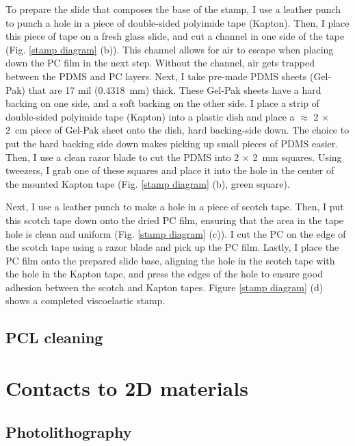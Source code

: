 \documentclass[double,12pt,1in]{beavtex}
\begin{document}
To prepare the slide that composes the base of the stamp, I use a leather punch to punch a hole in a piece of double-sided polyimide tape (Kapton). Then, I place this piece of tape on a fresh glass slide, and cut a channel in one side of the tape (Fig. \ref{stamp diagram} (b)). This channel allows for air to escape when placing down the PC film in the next step. Without the channel, air gets trapped between the PDMS and PC layers. Next, I take pre-made PDMS sheets (Gel-Pak) that are 17 mil (\SI{0.4318}{\milli\meter}) thick. These Gel-Pak sheets have a hard backing on one side, and a soft backing on the other side. I place a strip of double-sided polyimide tape (Kapton) into a plastic dish and place a $\approx$ 2 $\times$ \SI{2}{\centi\meter} piece of Gel-Pak sheet onto the dish, hard backing-side down. The choice to put the hard backing side down makes picking up small pieces of PDMS easier. Then, I use a clean razor blade to cut the PDMS into 2 $\times$ \SI{2}{mm} squares. Using tweezers, I grab one of these squares and place it into the hole in the center of the mounted Kapton tape (Fig. \ref{stamp diagram} (b), green square).

Next, I use a leather punch to make a hole in a piece of scotch tape. Then, I put this scotch tape down onto the dried PC film, ensuring that the area in the tape hole is clean and uniform (Fig. \ref{stamp diagram} (c)). I cut the PC on the edge of the scotch tape using a razor blade and pick up the PC film. Lastly, I place the PC film onto the prepared slide base, aligning the hole in the scotch tape with the hole in the Kapton tape, and press the edges of the hole to ensure good adhesion between the scotch and Kapton tapes. Figure \ref{stamp diagram} (d) shows a completed viscoelastic stamp.







\subsection{PCL cleaning}

\section{Contacts to 2D materials}

\subsection{Photolithography}
\end{document}

